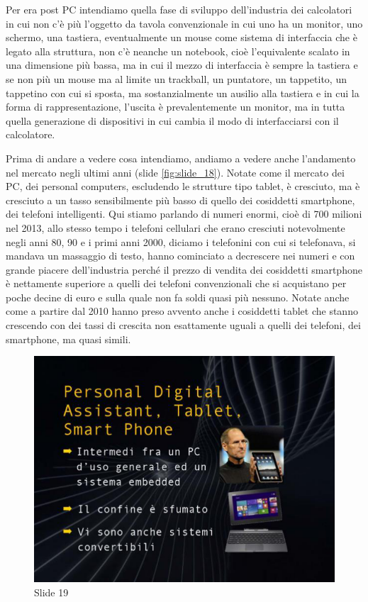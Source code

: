 Per era post PC  intendiamo quella fase di sviluppo dell'industria dei calcolatori in cui non c'è più l'oggetto da tavola convenzionale in cui uno ha un monitor, uno schermo, una tastiera, eventualmente un mouse come sistema di interfaccia che è legato alla struttura, non c'è neanche un notebook, cioè l'equivalente scalato in una dimensione più bassa, ma in cui il mezzo di interfaccia è sempre la tastiera e se non più un mouse ma al limite un trackball, un puntatore, un tappetito, un tappetino con cui si sposta, ma sostanzialmente un ausilio alla tastiera e in cui la forma di rappresentazione, l'uscita è prevalentemente un monitor, ma in tutta quella generazione di dispositivi in cui cambia il modo di interfacciarsi con il calcolatore.

Prima di andare a vedere cosa intendiamo, andiamo a vedere anche l'andamento nel mercato negli ultimi anni (slide \ref{fig:slide_18}).
Notate come il mercato dei PC, dei personal computers, escludendo le strutture tipo tablet, è cresciuto, ma è cresciuto a un tasso sensibilmente più basso di quello dei cosiddetti smartphone, dei telefoni intelligenti.
Qui stiamo parlando di numeri enormi, cioè di 700 milioni nel 2013, allo stesso tempo i telefoni cellulari che erano cresciuti notevolmente negli anni 80, 90 e i primi anni 2000, diciamo i telefonini con cui si telefonava, si mandava un massaggio di testo, hanno cominciato a decrescere nei numeri e con grande piacere dell'industria perché il prezzo di vendita dei cosiddetti smartphone è nettamente superiore a quelli dei telefoni convenzionali che si acquistano per poche decine di euro e sulla quale non fa soldi quasi più nessuno.
Notate anche come a partire dal 2010 hanno preso avvento anche i cosiddetti tablet che stanno crescendo con dei tassi di crescita non esattamente uguali a quelli dei telefoni, dei smartphone, ma quasi simili.


\begin{figure}[ht]
    \centering
    \includegraphics[width=0.6\linewidth]{images/Lez01_p04_fig_02.png}
    \caption{Slide 19}
    \label{fig:slide_19}
\end{figure}


